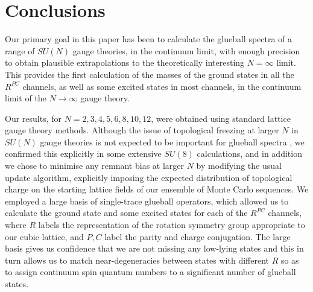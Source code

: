 \documentclass[12pt]{article}
\begin{document}
%
%
%
%
\section{Conclusions}
\label{section_conclusion} 

Our primary goal in this paper has been to calculate the glueball spectra of a range
of $SU(N)$ gauge theories, in the continuum limit, with enough precision to obtain plausible
extrapolations to the theoretically interesting $N=\infty$ limit. This provides
the first calculation of the masses of the ground states 
in all the $R^{PC}$ channels, as well as some excited states in most channels,
in the continuum limit of the $N\to\infty$ gauge theory.

Our results, for $N=2,3,4,5,6,8,10,12$, were obtained using standard lattice gauge theory 
methods. Although the issue of topological freezing at larger $N$ in $SU(N)$ gauge theories 
is not expected to be important for glueball spectra
%
\cite{Witten_98,LDDGMEV_Q},
%
we confirmed this explicitly in some extensive $SU(8)$ calculations, and in addition
we chose to minimise any remnant bias at larger $N$ by modifying the usual update algorithm, 
explicitly imposing the expected distribution of topological charge on the starting 
lattice fields of our ensemble of Monte Carlo sequences.
We employed a large basis of single-trace glueball operators, which allowed us
to calculate the ground state and some excited states for each of the $R^{PC}$ channels,
where $R$ labels the representation of the rotation symmetry group appropriate
to our cubic lattice, and $P,C$ label the parity and charge conjugation. The large basis
gives us confidence that we are not missing any low-lying states and this in turn
allows us to match near-degeneracies between states with different $R$ so as to
assign continuum spin quantum numbers to a significant number of glueball states.
\end{document}
